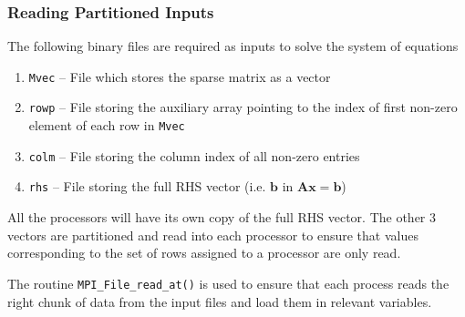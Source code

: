 \documentclass[sigplan,screen]{acmart}
\begin{document}
\subsubsection{Reading Partitioned Inputs}
The following binary files are required as inputs to solve the system of equations
\begin{enumerate}
	\item \texttt{Mvec} -- File which stores the sparse matrix as a vector
	\item \texttt{rowp} -- File storing the auxiliary array pointing to the index of first non-zero element of each row in \texttt{Mvec}
	\item \texttt{colm} -- File storing the column index of all non-zero entries
	\item \texttt{rhs} -- File storing the full RHS vector (i.e. $\mathbf{b}$ in $\mathbf{A}\mathbf{x}=\mathbf{b}$)
\end{enumerate} 

All the processors will have its own copy of the full RHS vector. The other 3 vectors are partitioned and read into each processor to ensure that values corresponding to the set of rows assigned to a processor are only read. 

The routine \texttt{MPI\_File\_read\_at()} is used to ensure that each process reads the right chunk of data from the input files and load them in relevant variables.
\end{document}
